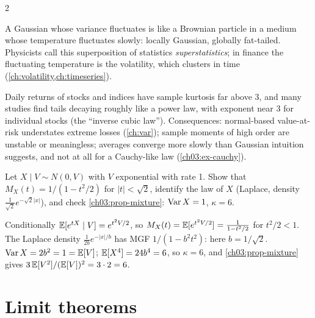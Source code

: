 \begin{paracol}{2}
\begin{intuition}[Superstatistics]
A Gaussian whose variance fluctuates is like a Brownian particle in a medium whose temperature fluctuates
slowly: locally Gaussian, globally fat-tailed. Physicists call this superposition of statistics
\emph{superstatistics}; in finance the fluctuating temperature is the volatility, which clusters in time
(\cref{ch:volatility,ch:timeseries}).
\end{intuition}

\begin{finance}
Daily returns of stocks and indices have sample kurtosis far above 3, and many studies find tails decaying
roughly like a power law, with exponent near 3 for individual stocks (the ``inverse cubic law''). Consequences:
normal-based value-at-risk understates extreme losses (\cref{ch:var}); sample moments of high order are
unstable or meaningless; averages converge more slowly than Gaussian intuition suggests, and not at all for a
Cauchy-like law (\cref{ch03:ex-cauchy}).
\end{finance}

\begin{exercise}\label{ch03:ex-laplace}
Let $X\mid V\sim N(0,V)$ with $V$ exponential with rate 1. Show that $M_X(t)=1/(1-t^2/2)$ for $|t|<\sqrt2$, identify the law of
$X$ (Laplace, density $\frac1{\sqrt2}e^{-\sqrt2|x|}$), and check \cref{ch03:prop-mixture}: $\operatorname{Var} X=1$, $\kappa=6$.
\end{exercise}
\begin{solution}[ch03:ex-laplace]
Conditionally $\mathbb{E}[e^{tX}\mid V]=e^{t^2V/2}$, so $M_X(t)=\mathbb{E}[e^{t^2V/2}]=\frac1{1-t^2/2}$ for $t^2/2<1$. The Laplace density
$\frac{1}{2b}e^{-|x|/b}$ has MGF $1/(1-b^2t^2)$: here $b=1/\sqrt2$. $\operatorname{Var} X=2b^2=1=\mathbb{E}[V]$; $\mathbb{E}[X^4]=24b^4=6$, so $\kappa=6$, and
\cref{ch03:prop-mixture} gives $3\,\mathbb{E}[V^2]/(\mathbb{E}[V])^2=3\cdot2=6$.
\end{solution}

\section{Limit theorems}\label{ch03:sec-limits}


\end{paracol}
